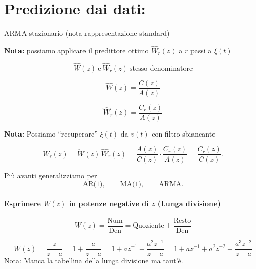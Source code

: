 \documentclass[11pt,a4paper]{article}
\begin{document}

\section{Predizione dai dati:}

ARMA stazionario (nota rappresentazione standard)

\textbf{Nota:} possiamo applicare il predittore ottimo $\hat W_r(z)$ a $r$ passi a $\xi(t)$

\[
\hat W(z)\ \text{e}\ \hat W_r(z)\ \text{stesso denominatore}
\]

\[
\hat W(z)=\frac{C(z)}{A(z)}
\]

\[
\hat W_r(z)=\frac{C_r(z)}{A(z)}
\]

\textbf{Nota:} Possiamo ``recuperare'' $\xi(t)$ da $v(t)$ con filtro sbiancante

\begin{center}
\end{center}
\vspace{-1pt}
\[
W_r(z)=\check W(z)\,\hat W_r(z)
      =\frac{A(z)}{C(z)}\cdot \frac{C_r(z)}{A(z)}
      =\frac{C_r(z)}{C(z)}.
\]

\vspace{1em}

Più avanti generalizziamo per
\[
\text{AR(1)},\qquad \text{MA(1)},\qquad \text{ARMA}.
\]

\paragraph{Esprimere $W(z)$ in potenze negative di $z$ (Lunga divisione)}

\[
W(z)=\frac{\mathrm{Num}}{\mathrm{Den}}
=
\text{Quoziente}+\frac{\text{Resto}}{\mathrm{Den}}
\]

\[
W(z)=\frac{z}{z-a} =1+\frac{a}{z-a} =1+a z^{-1}+\frac{a^2 z^{-1}}{z-a} =1+a z^{-1}+a^2 z^{-2}+\frac{a^3 z^{-2}}{z-a}
\]
Nota: Manca la tabellina della lunga divisione ma tant'è. 
\vspace{0.8em}
\end{document}
